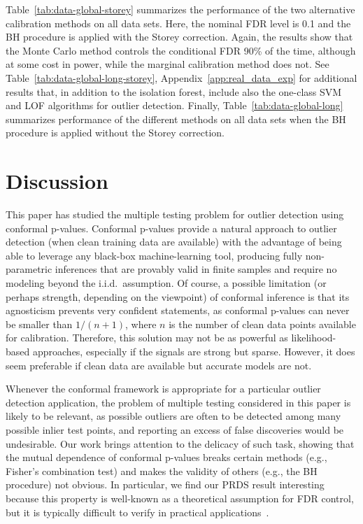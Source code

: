  Table~\ref{tab:data-global-storey} summarizes the performance of the two alternative calibration methods on all data sets.
 Here, the nominal FDR level is 0.1 and the BH procedure is applied with the Storey correction. Again, the results show that the Monte Carlo method controls the conditional FDR 90\% of the time, although at some cost in power, while the marginal calibration method does not.
  See Table~\ref{tab:data-global-long-storey}, Appendix~\ref{app:real_data_exp} for additional results that, in addition to the isolation forest, include also the one-class SVM and LOF algorithms for outlier detection. Finally, Table~\ref{tab:data-global-long} summarizes performance of the different methods on all data sets when the BH procedure is applied without the Storey correction.

{\small
}

\section{Discussion} \label{sec:discussion}

This paper has studied the multiple testing problem for outlier detection using conformal p-values.
Conformal p-values provide a natural approach to outlier detection (when clean training data are available) with the advantage of being able to leverage any black-box machine-learning tool, producing fully non-parametric inferences that are provably valid in finite samples and require no modeling beyond the i.i.d.~assumption. Of course, a possible limitation (or perhaps strength, depending on the viewpoint) of conformal inference is that its agnosticism prevents very confident statements, as conformal p-values can never be smaller than $1/(n+1)$, where $n$ is the number of clean data points available for calibration. Therefore, this solution may not be as powerful as likelihood-based approaches, especially if the signals are strong but sparse.
However, it does seem preferable if clean data are available but accurate models are not.

Whenever the conformal framework is appropriate for a particular outlier detection application, the problem of multiple testing considered in this paper is likely to be relevant, as possible outliers are often to be detected among many possible inlier test points, and reporting an excess of false discoveries would be undesirable.
Our work brings attention to the delicacy of such task, showing that the mutual dependence of conformal p-values breaks certain methods (e.g., Fisher's combination test) and makes the validity of others (e.g., the BH procedure) not obvious.
In particular, we find our PRDS result interesting because this property is well-known as a theoretical assumption for FDR control, but it is typically difficult to verify in practical applications~\cite{benjamini2001control, clarke2009robustness}.

